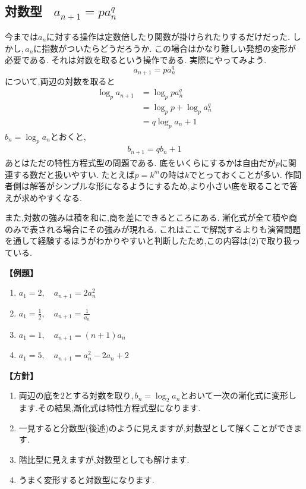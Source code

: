 
  \subsection{対数型 \, $a_{n+1}=pa_n^q$}
    今までは$a_n$に対する操作は定数倍したり関数が掛けられたりするだけだった.
    しかし,\,$a_n$に指数がついたらどうだろうか.
    この場合はかなり難しい発想の変形が必要である.
    それは対数を取るという操作である.
    実際にやってみよう.
    \[
      a_{n+1}=pa_n^q
    \]
    について,両辺の対数を取ると
    \begin{align*}
      \log_p{a_{n+1}}&=\log_p{pa_n^q}\\
      &=\log_p{p}+\log_p{a_n^q}\\
      &=q\log_p{a_n}+1
    \end{align*}
    $b_n=\log_p{a_n}$とおくと,
    \begin{align*}
      b_{n+1}=qb_n+1
    \end{align*}
    あとはただの特性方程式型の問題である.
    底をいくらにするかは自由だが$p$に関連する数だと扱いやすい.
    たとえば$p=k^m$の時は$k$でとっておくことが多い.
    作問者側は解答がシンプルな形になるようにするため,より小さい底を取ることで答えが求めやすくなる.

    また,対数の強みは積を和に,商を差にできるところにある.
    漸化式が全て積や商のみで表される場合にその強みが現れる.
    これはここで解説するよりも演習問題を通して経験するほうがわかりやすいと判断したため,この内容は(2)で取り扱っている.
  
    \noindent\textbf{【例題】}
    \begin{enumerate}[label=(\arabic*),parsep=3pt]
      \item $\displaystyle a_1=2,\quad a_{n+1}=2a_n^2$
      \item $\displaystyle a_1=\frac{1}{2},\quad a_{n+1}=\frac{1}{a_n}$
      \item $\displaystyle a_1=1,\quad a_{n+1}=(n+1)a_n$
      \item $\displaystyle a_1=5,\quad a_{n+1}=a_n^2-2a_n+2$
    \end{enumerate}

    \noindent\textbf{【方針】}
    \begin{enumerate}[label=(\arabic*),parsep=3pt]
      \item 両辺の底を$2$とする対数を取り,\,$b_n=\log_2a_n$とおいて一次の漸化式に変形します.その結果,漸化式は特性方程式型になります.
      \item 一見すると分数型(後述)のように見えますが,対数型として解くことができます.
      \item 階比型に見えますが,対数型としても解けます.
      \item うまく変形すると対数型になります.
    \end{enumerate}

